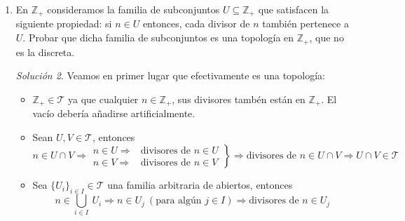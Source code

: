 \documentclass[12pt,twoside]{report}
\newcommand\mc[1]{\mathcal{#1}}
\theoremstyle{azul}
\theoremstyle{azul2}
\theoremstyle{plain}
\theoremstyle{definition}
\theoremstyle{remark}
\newtheorem*{sol}{Solución}
\begin{document}
\begin{enumerate}
\begin{sol}
    Veamos ahora la naturaleza topol{\'o}gica de los conjuntos propuestos:
    \begin{itemize}
        \item $A_1=\{90, 2^{10}, 5^{21}-1\}$ es abierto ya que est{\'a} compuesto por n{\'u}meros pares; claramente 90 es divisible por 2, $2^{10}$ tambi{\'e}n, y $5^{21}-1$ sabiendo que toda potencia de 5 acaba en 5, restando 1 acaba en 4, por tanto divisible por 2. No es cerrado ya que su complematario contiene impares, por tanto no abierto.
        \item $A_2=\{\text{n{\'u}meros primos}\}$ no es abierto ya que (a excepi{\'o}n del 2) ning{\'u}n n{\'u}mero primo es par. Tampoco es cerrado ya que su complementario contendr{\'i}a n{\'u}meros pares e impares que no sean primos, luego no ser{\'a} abierto.
        \item $A_3 = \{\text{n{\'u}meros impares}\}$ es cerrado ya que su complementario son todos los pares, luego abierto. No es abierto ya que no contiene ning{\'u}n par. 
    \end{itemize}
    \end{sol}
    \item \justifying En $\mathbb{Z}_{+}$ consideramos la familia de subconjuntos $U \subseteq \mathbb{Z}_{+}$ que satisfacen la siguiente propiedad: si $n \in U$ entonces, cada divisor de $n$ tambi{\'e}n pertenece a $U$. Probar que dicha familia de subconjuntos es una topolog{\'i}a en $\mathbb{Z}_{+}$, que no es la discreta.
    \begin{sol}
    Veamos en primer lugar que efectivamente es una topolog{\'i}a:
    \begin{itemize}
        \item $\mathbb{Z}_+ \in \mc{T}$ ya que cualquier $n \in \mathbb{Z}_+$, sus divisores tamb{\'e}n est{\'a}n en $\mathbb{Z}_+$. El vac{\'i}o deber{\'i}a añadirse artificialmente.
        \item Sean $U, V \in \mc{T}$, entonces
        $$n \in U \cap V \Rightarrow \left.\begin{array}{cc}
             n \in U \Rightarrow & \text{divisores de } n \in U \\
             n \in V \Rightarrow & \text{divisores de } n \in V
        \end{array}\right\} \Rightarrow \text{divisores de } n \in U \cap V \Rightarrow U \cap V \in \mc{T}$$
        \item Sea $\{U_i\}_{i \in I} \in \mc{T}$ una familia arbitraria de abiertos, entonces
        $$n \in \underset{i \in I}{\bigcup}\: U_i \Rightarrow n \in U_j \: (\text{para alg{\'u}n } j \in I) \Rightarrow \text{divisores de } n \in U_j$$
        

\end{itemize}
\end{sol}
\end{enumerate}
\end{document}
